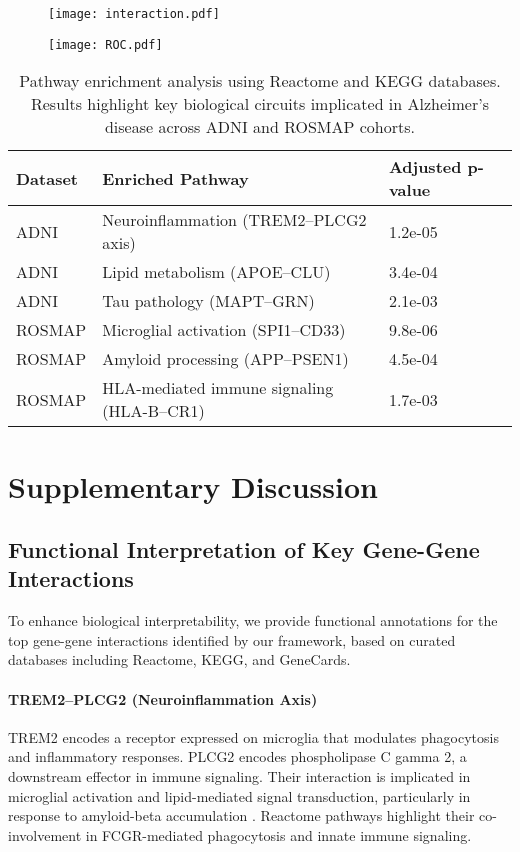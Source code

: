 \documentclass[12pt]{article}
\begin{document}
\begin{figure}[H]
\centering
\texttt{[image: interaction.pdf]}
\end{figure}

\begin{figure}[H]
\centering
\texttt{[image: ROC.pdf]}
\end{figure}

\begin{table}[H]
\centering
\scriptsize
\begin{tabular}{lll}
\toprule
\textbf{Dataset} & \textbf{Enriched Pathway} & \textbf{Adjusted p-value} \\
\midrule
ADNI & Neuroinflammation (TREM2–PLCG2 axis) & 1.2e-05 \\
ADNI & Lipid metabolism (APOE–CLU) & 3.4e-04 \\
ADNI & Tau pathology (MAPT–GRN) & 2.1e-03 \\
ROSMAP & Microglial activation (SPI1–CD33) & 9.8e-06 \\
ROSMAP & Amyloid processing (APP–PSEN1) & 4.5e-04 \\
ROSMAP & HLA-mediated immune signaling (HLA-B–CR1) & 1.7e-03 \\
\bottomrule
\end{tabular}
\caption{Pathway enrichment analysis using Reactome and KEGG databases. Results highlight key biological circuits implicated in Alzheimer's disease across ADNI and ROSMAP cohorts.}
\end{table}

\section*{Supplementary Discussion}

\subsection*{Functional Interpretation of Key Gene-Gene Interactions}

To enhance biological interpretability, we provide functional annotations for the top gene-gene interactions identified by our framework, based on curated databases including Reactome, KEGG, and GeneCards.

\paragraph{TREM2–PLCG2 (Neuroinflammation Axis)}
TREM2 encodes a receptor expressed on microglia that modulates phagocytosis and inflammatory responses. PLCG2 encodes phospholipase C gamma 2, a downstream effector in immune signaling. Their interaction is implicated in microglial activation and lipid-mediated signal transduction, particularly in response to amyloid-beta accumulation \citep{geneCardsTREM2, reactomeTREM2PLCG2}. Reactome pathways highlight their co-involvement in FCGR-mediated phagocytosis and innate immune signaling.
\end{document}
